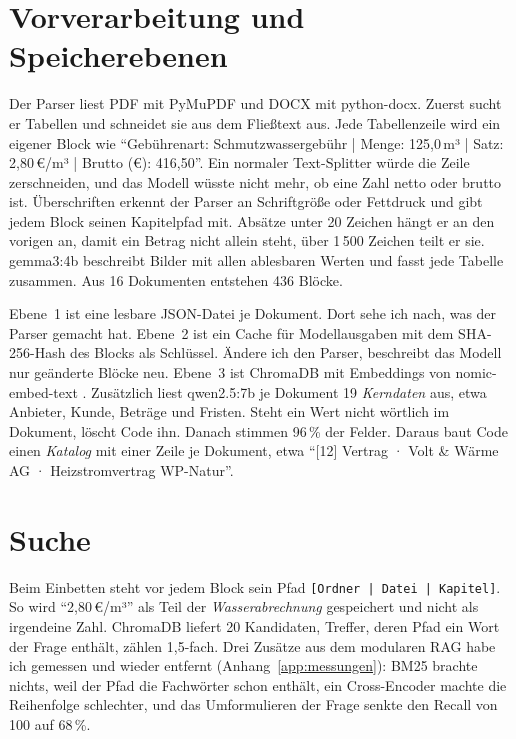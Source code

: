 \section{Vorverarbeitung und Speicherebenen}

Der Parser liest PDF mit PyMuPDF und DOCX mit python-docx. Zuerst sucht er Tabellen und schneidet sie aus dem Fließtext aus. Jede Tabellenzeile wird ein eigener Block wie \enquote{Gebührenart: Schmutzwassergebühr | Menge: 125,0\,m³ | Satz: 2,80\,€/m³ | Brutto (€): 416,50}. Ein normaler Text-Splitter würde die Zeile zerschneiden, und das Modell wüsste nicht mehr, ob eine Zahl netto oder brutto ist. Überschriften erkennt der Parser an Schriftgröße oder Fettdruck und gibt jedem Block seinen Kapitelpfad mit. Absätze unter 20 Zeichen hängt er an den vorigen an, damit ein Betrag nicht allein steht, über 1\,500 Zeichen teilt er sie. gemma3:4b beschreibt Bilder mit allen ablesbaren Werten und fasst jede Tabelle zusammen. Aus 16 Dokumenten entstehen 436 Blöcke.

Ebene~1 ist eine lesbare JSON-Datei je Dokument. Dort sehe ich nach, was der Parser gemacht hat. Ebene~2 ist ein Cache für Modellausgaben mit dem SHA-256-Hash des Blocks als Schlüssel. Ändere ich den Parser, beschreibt das Modell nur geänderte Blöcke neu. Ebene~3 ist ChromaDB mit Embeddings von nomic-embed-text \cite{nussbaum2024}. Zusätzlich liest qwen2.5:7b je Dokument 19 \emph{Kerndaten} aus, etwa Anbieter, Kunde, Beträge und Fristen. Steht ein Wert nicht wörtlich im Dokument, löscht Code ihn. Danach stimmen 96\,\% der Felder. Daraus baut Code einen \emph{Katalog} mit einer Zeile je Dokument, etwa \enquote{[12] Vertrag · Volt \& Wärme AG · Heizstromvertrag WP-Natur}.

\section{Suche}

Beim Einbetten steht vor jedem Block sein Pfad \texttt{[Ordner | Datei | Kapitel]}. So wird \enquote{2,80\,€/m³} als Teil der \emph{Wasserabrechnung} gespeichert und nicht als irgendeine Zahl. ChromaDB liefert 20 Kandidaten, Treffer, deren Pfad ein Wort der Frage enthält, zählen 1,5-fach. Drei Zusätze aus dem modularen RAG habe ich gemessen und wieder entfernt (Anhang~\ref{app:messungen}): BM25 \cite{robertson2009} brachte nichts, weil der Pfad die Fachwörter schon enthält, ein Cross-Encoder \cite{nogueira2019} machte die Reihenfolge schlechter, und das Umformulieren der Frage senkte den Recall von 100 auf 68\,\%.

